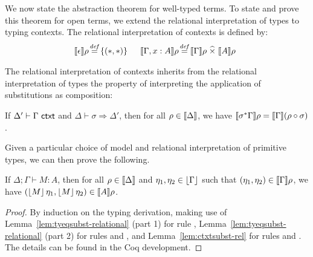 We now state the abstraction theorem for well-typed terms. To state
and prove this theorem for open terms, we extend the
relational interpretation of types to typing contexts. The relational
interpretation of contexts is defined by: %
\begin{displaymath}
  \begin{array}{@{}l@{\hspace{0.1em}\isDefinedAs\hspace{0.1em}}l@{\hspace{1.5em}}l@{\hspace{0.1em}\isDefinedAs\hspace{0.1em}}l}
    \rsem{\epsilon} {\rho} & \{(*,*)\} &
    \rsem{\Gamma, x : A} {\rho} & \rsem{\Gamma} \rho \relTimes \rsem{A} \rho
  \end{array}
\end{displaymath}

The relational interpretation of contexts inherits from the relational
interpretation of types the property of interpreting the application
of substitutions as composition:
\begin{lemma}\label{lem:ctxtsubst-rel}
  If $\Delta' \vdash \Gamma \textup{\textsf{ ctxt}}$ and $\Delta \vdash \sigma
  \Rightarrow \Delta'$, then for all $\rho \in \llbracket \Delta \rrbracket$,
we have 
  $\llbracket \sigma^*\Gamma \rrbracket \rho =
  \llbracket \Gamma \rrbracket(\rho \circ \sigma)$.
\end{lemma}

Given a particular choice of model and relational interpretation of
primitive types, we can then prove the following.
\begin{theorem}[Abstraction]\label{thm:abstraction}
  If $\Delta; \Gamma \vdash M :
  A$, then for all $\rho \in \llbracket \Delta \rrbracket$ and $\eta_1, \eta_2
  \in \left\lfloor \Gamma \right\rfloor$ such that $(\eta_1, \eta_2) \in
  \llbracket \Gamma \rrbracket \rho$, we have $(\left\lfloor{M}\right\rfloor\eta_1,
  \left\lfloor{M}\right\rfloor\eta_2) \in \llbracket A \rrbracket \rho$.
\end{theorem}
\begin{proof}
By induction on the typing derivation, making use of
Lemma~\ref{lem:tyeqsubst-relational} (part 1) for rule ,
Lemma~\ref{lem:tyeqsubst-relational} (part 2) for rules  and ,
and Lemma~\ref{lem:ctxtsubst-rel} for rules  and . 
The details can be found in the Coq development.
\end{proof}

